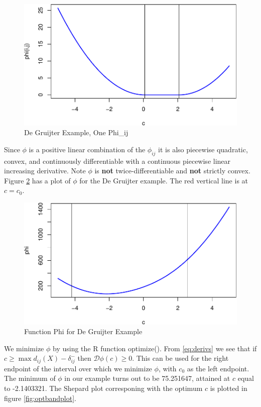 \documentclass[
  12pt,
]{article}
\begin{document}
\begin{figure}
\centering
\includegraphics{smacofAC_files/figure-latex/onefunc-1.pdf}
\caption{\label{fig:onefunc}De Gruijter Example, One Phi\_ij}
\end{figure}

Since \(\phi\) is a positive linear combination of the \(\phi_{ij}\) it is also piecewise quadratic, convex, and continuously differentiable
with a continuous piecewise linear increasing derivative. Note \(\phi\) is \textbf{not} twice-differentiable
and \textbf{not} strictly convex. Figure \ref{fig:morefunc} has a plot of \(\phi\) for the De Gruijter
example. The red vertical line is at \(c=c_0\).

\begin{figure}
\centering
\includegraphics{smacofAC_files/figure-latex/morefunc-1.pdf}
\caption{\label{fig:morefunc}Function Phi for De Gruijter Example}
\end{figure}

We minimize \(\phi\) by using the R function optimize(). From \eqref{eq:derivs} we see that
if \(c\geq\max d_{ij}(X)-\delta_{ij}^-\) then \(\mathcal{D}\phi(c)\geq 0\). This can be used
for the right endpoint of the interval over which we minimize \(\phi\), with \(c_0\) as the left endpoint. The minimum of \(\phi\) in our example turns out to be 75.251647, attained at \(c\) equal to
-2.1403321. The Shepard plot corresponing with the optimum \(c\) is plotted in figure \ref{fig:optbandplot}.
\end{document}
